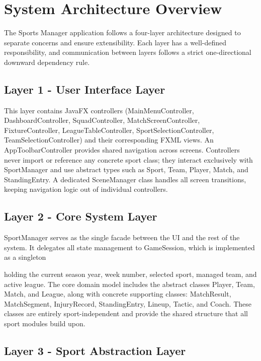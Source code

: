 \documentclass[11pt,a4paper]{article}
\begin{document}
\section{System Architecture Overview}

The Sports Manager application follows a four-layer architecture designed to separate concerns and ensure extensibility. Each layer has a well-defined responsibility, and communication between layers follows a strict one-directional downward dependency rule.

\subsection*{Layer 1 - User Interface Layer}

This layer contains JavaFX controllers (MainMenuController, DashboardController, SquadController, MatchScreenController, FixtureController, LeagueTableController, SportSelectionController, TeamSelectionController) and their corresponding FXML views. An AppToolbarController provides shared navigation across screens. Controllers never import or reference any concrete sport class; they interact exclusively with SportManager and use abstract types such as Sport, Team, Player, Match, and StandingEntry. A dedicated SceneManager class handles all screen transitions, keeping navigation logic out of individual controllers.

\subsection*{Layer 2 - Core System Layer}

SportManager serves as the single facade between the UI and the rest of the system. It delegates all state management to GameSession, which is implemented as a singleton

holding the current season year, week number, selected sport, managed team, and active league. The core domain model includes the abstract classes Player, Team, Match, and League, along with concrete supporting classes: MatchResult, MatchSegment, InjuryRecord, StandingEntry, Lineup, Tactic, and Coach. These classes are entirely sport-independent and provide the shared structure that all sport modules build upon.

\subsection*{Layer 3 - Sport Abstraction Layer}
\end{document}
